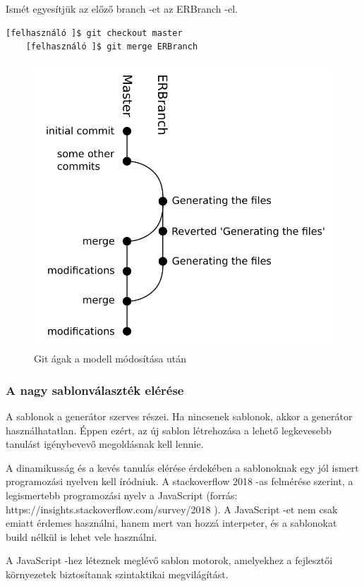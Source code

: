\documentclass[a4paper,12pt,oneside]{report}
\begin{document}
\begin{justify}
	Ismét egyesítjük az előző branch -et az ERBranch -el. 

	\begin{lstlisting}[language=bash]
	[felhasználó ]$ git checkout master
	[felhasználó ]$ git merge ERBranch
	\end{lstlisting}

	\begin{figure}[h]
		\includegraphics[width=\textwidth]{contents/images/git_second.png}
		\caption{Git ágak a modell módosítása után}
		\label{fig:git_second}
	\end{figure}


\end{justify}

\newpage
\subsubsection{A nagy sablonválaszték elérése}

\begin{justify}

	A sablonok a generátor szerves részei. Ha nincsenek sablonok, akkor a generátor használhatatlan. Éppen ezért, az új sablon létrehozása a lehető legkevesebb tanulást igénybevevő megoldásnak kell lennie. 

	A dinamikusság és a kevés tanulás elérése érdekében a sablonoknak egy jól ismert programozási nyelven kell íródniuk. A stackoverflow 2018 -as felmérése szerint, a legismertebb programozási nyelv a JavaScript (forrás: https://insights.stackoverflow.com/survey/2018 ). A JavaScript -et nem csak emiatt érdemes használni, hanem mert van hozzá interpeter, és a sablonokat build nélkül is lehet vele használni.

	A JavaScript -hez léteznek meglévő sablon motorok, amelyekhez a fejlesztői környezetek biztosítanak szintaktikai megvilágítást.


\end{justify}
\end{document}
